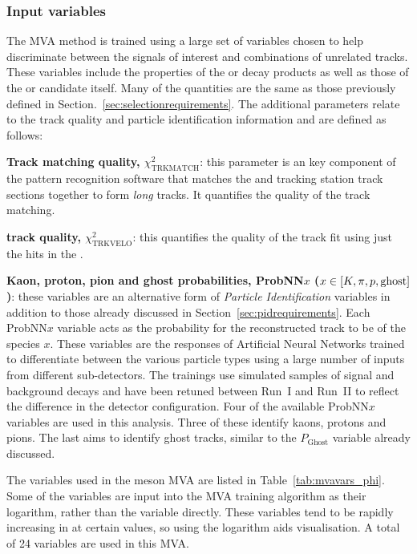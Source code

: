 \subsubsection{Input variables}


The MVA method is trained using a large set of variables chosen to help discriminate between the signals of interest and combinations of unrelated tracks. These variables include the properties of the \Kpm or \pipm decay products as well as those of the \phiz or \Dsp candidate itself. Many of the quantities are the same as those previously defined in Section.~\ref{sec:selectionrequirements}. The additional parameters relate to the track quality and particle identification information and are defined as follows:

\begin{description}
\item \textbf{Track matching quality, $\chi^{2}_{\text{TRKMATCH}}$}: this parameter is an key component of the pattern recognition software that matches the \velo and tracking station track sections together to form \emph{long} tracks. It quantifies the quality of the track matching.

\item \textbf{\velo track quality, $\chi^{2}_{\text{TRKVELO}}$}: this quantifies the quality of the track fit using just the hits in the \velo.  


\item \textbf{Kaon, proton, pion and ghost probabilities, ProbNN$x$ ($x\in[K,\pi,{p},\text{ghost}]$)}: these variables are an alternative form of \emph{Particle Identification} variables in addition to those already discussed in Section~\ref{sec:pidrequirements}. Each ProbNN$x$ variable acts as the probability for the reconstructed track to be of the species $x$. These variables are the responses of Artificial Neural Networks trained to differentiate between the various particle types using a large number of inputs from different sub-detectors. The trainings use simulated samples of signal and background decays and have been retuned between Run~I and Run~II to reflect the difference in the detector configuration. Four of the available ProbNN$x$ variables are used in this analysis. Three of these identify kaons, protons and pions. The last aims to identify ghost tracks, similar to the $P_{\text{Ghost}}$ variable already discussed. 
\end{description}

The variables used in the \phiz meson MVA are listed in Table~\ref{tab:mvavars_phi}. Some of the variables are input into the MVA training algorithm as their logarithm, rather than the variable directly. These variables tend to be rapidly increasing in at certain values, so using the logarithm aids visualisation. A total of 24 variables are used in this MVA.

